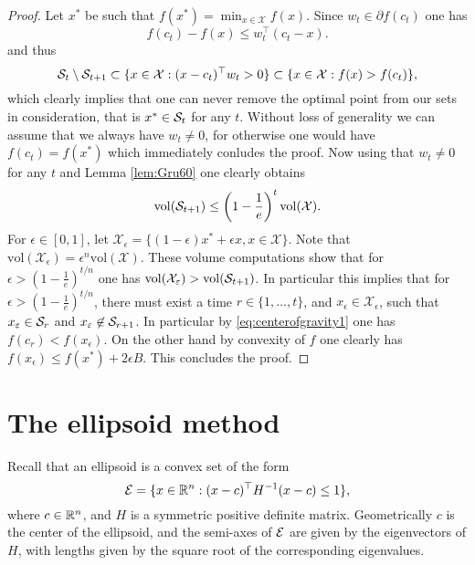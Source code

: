 \begin{proof}
Let $x^*$ be such that $f(x^*) = \min_{x \in \mathcal{X}} f(x)$. Since $w_t \in \partial f(c_t)$ one has
$$f(c_t) - f(x) \leq w_t^{\top} (c_t - x) .$$
and thus
\begin{equation} \label{eq:centerofgravity1}
\mathcal{S}_{t} \setminus \mathcal{S}_{t+1} \subset \{x \in \mathcal{X} : (x-c_t)^{\top} w_t > 0\} \subset \{x \in \mathcal{X} : f(x) > f(c_t)\} ,
\end{equation}
which clearly implies that one can never remove the optimal point from our sets in consideration, that is $x^* \in \mathcal{S}_t$ for any $t$.
Without loss of generality we can assume that we always have $w_t \neq 0$, for otherwise one would have $f(c_t) = f(x^*)$ which immediately conludes the proof. Now using that $w_t \neq 0$ for any $t$ and Lemma \ref{lem:Gru60} one clearly obtains
$$\mathrm{vol}(\mathcal{S}_{t+1}) \leq \left(1 - \frac1{e} \right)^t \mathrm{vol}(\mathcal{X}) .$$
For $\epsilon \in [0,1]$, let $\mathcal{X}_{\epsilon} = \{(1-\epsilon) x^* + \epsilon x, x \in \mathcal{X}\}$. Note that $\mathrm{vol}(\mathcal{X}_{\epsilon}) = \epsilon^n \mathrm{vol}(\mathcal{X})$. These volume computations show that for $\epsilon > \left(1 - \frac1{e} \right)^{t/n}$ one has $\mathrm{vol}(\mathcal{X}_{\varepsilon}) > \mathrm{vol}(\mathcal{S}_{t+1})$. In particular this implies that for $\epsilon > \left(1 - \frac1{e} \right)^{t/n}$, there must exist a time $r \in \{1,\hdots, t\}$, and $x_{\epsilon} \in \mathcal{X}_{\epsilon}$, such that $x_{\varepsilon} \in \mathcal{S}_{r}$ and $x_{\varepsilon} \not\in \mathcal{S}_{r+1}$. In particular by \eqref{eq:centerofgravity1} one has $f(c_r) < f(x_{\epsilon})$. On the other hand by convexity of $f$ one clearly has $f(x_{\epsilon}) \leq f(x^*) + 2 \epsilon B$. This concludes the proof.
\end{proof}

\section{The ellipsoid method} \label{sec:ellipsoid}
Recall that an ellipsoid is a convex set of the form
$$\mathcal{E} = \{x \in \mathbb{R}^n : (x - c)^{\top} H^{-1} (x-c) \leq 1 \} ,$$
where $c \in \mathbb{R}^n$, and $H$ is a symmetric positive definite matrix. Geometrically $c$ is the center of the ellipsoid, and the semi-axes of $\mathcal{E}$ are given by the eigenvectors of $H$, with lengths given by the square root of the corresponding eigenvalues.


